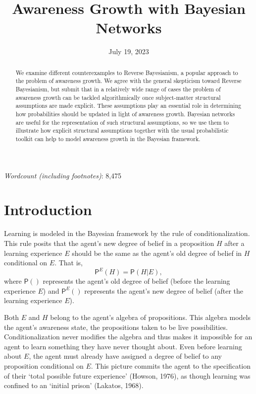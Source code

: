 \documentclass[
  11pt,
  dvipsnames,enabledeprecatedfontcommands, todos]{scrartcl}
\title{Awareness Growth with Bayesian Networks}
\author{}
\date{\vspace{-2.5em}July 19, 2023}
\newcommand{\pr}[1]{\ensuremath{\mathsf{P}(#1)}}
\newcommand{\ppr}[2]{\ensuremath{\mathsf{P}^{#1}(#2)}}
\begin{document}
\maketitle

\doublespace


\emph{Wordcount (including footnotes)}: 8,475

\begin{abstract}
We examine different counterexamples to Reverse Bayesianism, a popular approach to the problem of awareness growth. We agree with the general skepticism toward Reverse Bayesianism, but submit that in a relatively wide range of cases the problem of awareness growth  can be tackled algorithmically once subject-matter structural assumptions are made explicit. These assumptions play an essential role in determining how probabilities should be updated in light of awareness growth. Bayesian networks are useful for the representation of such structural assumptions, so we use them to illustrate how explicit structural assumptions together with the usual probabilistic toolkit can help to model awareness growth in the Bayesian framework. 
\end{abstract}

\doublespace
\linenumbers

\hypertarget{introduction}{%
\section{Introduction}\label{introduction}}

Learning is modeled in the Bayesian framework by the rule of
conditionalization. This rule posits that the agent's new degree of
belief in a proposition \(H\) after a learning experience \(E\) should
be the same as the agent's old degree of belief in \(H\) conditional on
\(E\). That is, \[\ppr{E}{H}=\pr{H \vert E},\] where \(\pr{}\)
represents the agent's old degree of belief (before the learning
experience \(E\)) and \(\ppr{E}{}\) represents the agent's new degree of
belief (after the learning experience \(E\)).

Both \(E\) and \(H\) belong to the agent's algebra of propositions. This
algebra models the agent's awareness state, the propositions taken to be
live possibilities. Conditionalization never modifies the algebra and
thus makes it impossible for an agent to learn something they have never
thought about. Even before learning about \(E\), the agent must already
have assigned a degree of belief to any proposition conditional on
\(E\). This picture commits the agent to the specification of their
`total possible future experience' (Howson, 1976), as though learning
was confined to an `initial prison' (Lakatos, 1968).
\end{document}
